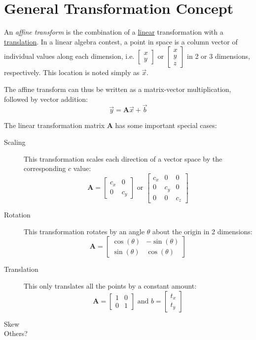 \section{General Transformation Concept}

An \emph{affine transform} is the combination of a \underline{linear} transformation with a \underline{translation}. In a linear algebra contest, a point in space is a column vector of individual values along each dimension, i.e. $\left[\begin{matrix}x\\y\end{matrix}\right]$ or $\left[\begin{matrix}x\\y\\z\end{matrix}\right]$ in 2 or 3 dimensions, respectively. This location is noted simply as $\vec{x}$.

The affine transform can thus be written as a matrix-vector multiplication, followed by vector addition:
\begin{equation}
\vec{y} = \mathbf{A}\vec{x} + \vec{b}
\end{equation}

The linear transformation matrix $\mathbf{A}$ has some important special cases:
\begin{description}
	\item[Scaling] This transformation scales each direction of a vector space by the corresponding $c$ value: $$\mathbf{A}=\left[\begin{matrix}
	c_x & 0 \\ 0 & c_y
	\end{matrix}\right] \text{ or } \left[\begin{matrix}
	c_x & 0 &0\\ 0 & c_y &0\\ 0&0&c_z
	\end{matrix}\right]$$
	
	\item[Rotation] This transformation rotates by an angle $\theta$ about the origin in 2 dimensions:$$\mathbf{A}=\left[\begin{matrix}
	\cos(\theta) & -\sin(\theta) \\\sin(\theta) & \cos(\theta)
	\end{matrix}\right]$$ 

	\item[Translation] This only translates all the points by a constant amount:$$\mathbf{A}=\left[\begin{matrix}
	1 & 0 \\0 &1
	\end{matrix}\right] \text{ and } b=\left[\begin{matrix}t_x\\t_y\end{matrix}\right]$$
	
	\item[Skew]
	
	\item[Others?]
	
\end{description}

